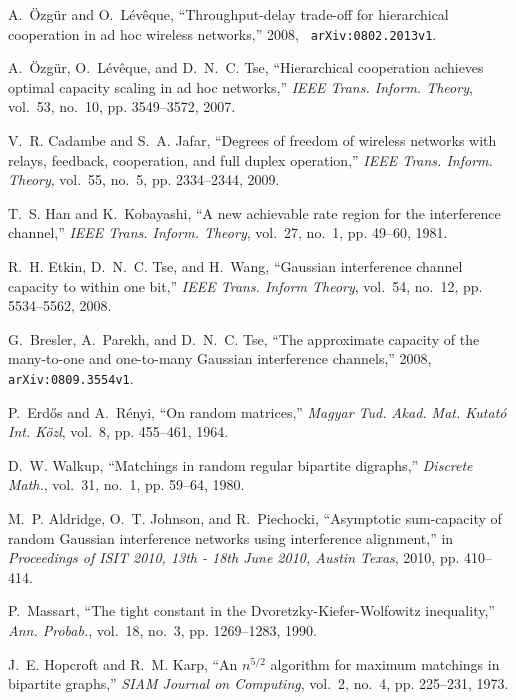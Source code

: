 \documentclass[journal]{IEEEtran}
\begin{document}
\begin{thebibliography}{10}
A.~{\"O}zg{\"u}r and O.~L{\'e}v{\^e}que, ``Throughput-delay trade-off for
  hierarchical cooperation in ad hoc wireless networks,'' 2008, {\tt
  arXiv:0802.2013v1}.

A.~{\"O}zg{\"u}r, O.~L{\'e}v{\^e}que, and D.~N.~C. Tse, ``Hierarchical
  cooperation achieves optimal capacity scaling in ad hoc networks,''
  \emph{IEEE Trans. Inform. Theory}, vol.~53, no.~10, pp. 3549--3572, 2007.

V.~R. Cadambe and S.~A. Jafar, ``Degrees of freedom of wireless networks with
  relays, feedback, cooperation, and full duplex operation,'' \emph{IEEE Trans.
  Inform. Theory}, vol.~55, no.~5, pp. 2334--2344, 2009.

T.~S. Han and K.~Kobayashi, ``A new achievable rate region for the interference
  channel,'' \emph{IEEE Trans. Inform. Theory}, vol.~27, no.~1, pp. 49--60,
  1981.

R.~H. Etkin, D.~N.~C. Tse, and H.~Wang, ``Gaussian interference channel
  capacity to within one bit,'' \emph{IEEE Trans. Inform Theory}, vol.~54,
  no.~12, pp. 5534--5562, 2008.

G.~Bresler, A.~Parekh, and D.~N.~C. Tse, ``The approximate capacity of the
  many-to-one and one-to-many { Gaussian} interference channels,'' 2008, {\tt
  arXiv:0809.3554v1}.

P.~Erd{\H{o}}s and A.~R{\'e}nyi, ``On random matrices,'' \emph{Magyar Tud.
  Akad. Mat. Kutat\'o Int. K\"ozl}, vol.~8, pp. 455--461, 1964.

D.~W. Walkup, ``Matchings in random regular bipartite digraphs,''
  \emph{Discrete Math.}, vol.~31, no.~1, pp. 59--64, 1980.

M.~P. Aldridge, O.~T. Johnson, and R.~Piechocki, ``Asymptotic sum-capacity of
  random {Gaussian} interference networks using interference alignment,'' in
  \emph{Proceedings of ISIT 2010, 13th - 18th June 2010, Austin Texas}, 2010,
  pp. 410--414.

P.~Massart, ``The tight constant in the {D}voretzky-{K}iefer-{W}olfowitz
  inequality,'' \emph{Ann. Probab.}, vol.~18, no.~3, pp. 1269--1283, 1990.

J.~E. Hopcroft and R.~M. Karp, ``An $n^{5/2} $ algorithm for maximum matchings
  in bipartite graphs,'' \emph{SIAM Journal on Computing}, vol.~2, no.~4, pp.
  225--231, 1973.

\end{thebibliography}
\end{document}
